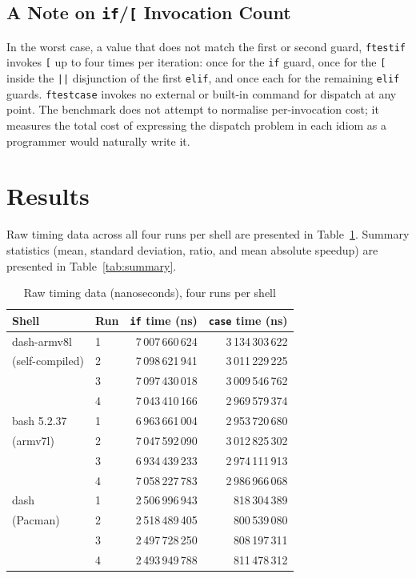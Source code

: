 \documentclass[11pt,a4paper]{article}
\begin{document}
\subsection{A Note on \texttt{if}/\texttt{[} Invocation Count}

In the worst case, a value that does not match the first or second
guard, \texttt{ftestif} invokes \texttt{[} up to four times per
iteration: once for the \texttt{if} guard, once for the \texttt{[}
inside the \texttt{||} disjunction of the first \texttt{elif},
and once each for the remaining \texttt{elif} guards.
\texttt{ftestcase} invokes no external or built-in command for
dispatch at any point.
The benchmark does not attempt to normalise per-invocation cost;
it measures the total cost of expressing the dispatch problem in each
idiom as a programmer would naturally write it.

\section{Results}

Raw timing data across all four runs per shell are presented in
Table~\ref{tab:raw}.
Summary statistics (mean, standard deviation, ratio, and mean
absolute speedup) are presented in Table~\ref{tab:summary}.

\begin{table}[H]
\centering
\caption{Raw timing data (nanoseconds), four runs per shell}
\label{tab:raw}
\small
\begin{tabular}{@{}llrr@{}}
\toprule
Shell & Run & \texttt{if} time (ns) & \texttt{case} time (ns) \\
\midrule
dash-armv8l  & 1 & 7\,007\,660\,624 & 3\,134\,303\,622 \\
(self-compiled) & 2 & 7\,098\,621\,941 & 3\,011\,229\,225 \\
             & 3 & 7\,097\,430\,018 & 3\,009\,546\,762 \\
             & 4 & 7\,043\,410\,166 & 2\,969\,579\,374 \\
\midrule
bash 5.2.37  & 1 & 6\,963\,661\,004 & 2\,953\,720\,680 \\
(armv7l)     & 2 & 7\,047\,592\,090 & 3\,012\,825\,302 \\
             & 3 & 6\,934\,439\,233 & 2\,974\,111\,913 \\
             & 4 & 7\,058\,227\,783 & 2\,986\,966\,068 \\
\midrule
dash         & 1 & 2\,506\,996\,943 & 818\,304\,389 \\
(Pacman)     & 2 & 2\,518\,489\,405 & 800\,539\,080 \\
             & 3 & 2\,497\,728\,250 & 808\,197\,311 \\
             & 4 & 2\,493\,949\,788 & 811\,478\,312 \\
\bottomrule
\end{tabular}
\end{table}
\end{document}
